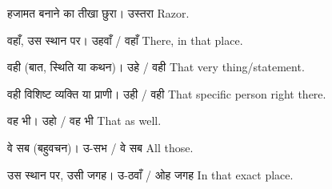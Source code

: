 %
{हजामत बनाने का तीखा छुरा।}%
{उस्तरा}%
{Razor.}

%
{वहाँ, उस स्थान पर।}%
{उहवाँ / वहाँ}%
{There, in that place.}

%
{वही (बात, स्थिति या कथन)।}%
{उहे / वही}%
{That very thing/statement.}

%
{वही विशिष्ट व्यक्ति या प्राणी।}%
{उही / वही}%
{That specific person right there.}

%
{वह भी।}%
{उहो / वह भी}%
{That as well.}

%
{वे सब (बहुवचन)।}%
{उ-सभ / वे सब}%
{All those.}

%
{उस स्थान पर, उसी जगह।}%
{उ-ठवाँ / ओह जगह}%
{In that exact place.}
